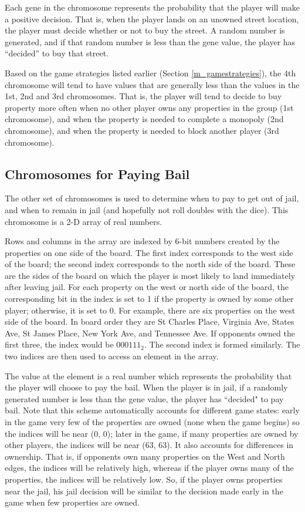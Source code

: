 Each gene in the chromosome represents the probability that the player will make
a positive decision. That is, when the player lands on an unowned street
location, the player must decide whether or not to buy the street. A random
number is generated, and if that random number is less than the gene value, the
player has ``decided'' to buy that street.

Based on the game strategies listed earlier (Section \ref{m_gamestrategies}),
the 4th chromosome will tend to have values that are generally
less than the values in the 1st, 2nd and 3rd chromosomes. That is, the player
will tend to decide to buy property more often when no other player owns any
properties in the group (1st chromosome), and when the property is needed to
complete a monopoly (2nd chromosome), and when the property is needed to block
another player (3rd chromosome).

\subsection{Chromosomes for Paying Bail}

The other set of chromosomes is used to determine when to pay to get out of
jail, and when to remain in jail (and hopefully not roll doubles with the dice).
This chromosome is a 2-D array of real numbers.

Rows and columns in the array are indexed by 6-bit numbers created by the
properties on one side of the board. The first index corresponds to the west
side of the board; the second index corresponds to the north side of the board.
These are the sides of the board on which the player is most likely to land
immediately after leaving jail. For each property on the west or north side of
the board, the corresponding bit in the index is set to 1 if the property is
owned by some other player; otherwise, it is set to 0. For example, there are
six properties on the west side of the board. In board order they are St Charles
Place, Virginia Ave, States Ave, St James Place, New York Ave, and Tennessee
Ave. If opponents owned the first three, the index would be $000111_2$. The
second index is formed similarly. The two indices are then used to access an
element in the array.

The value at the element is a real number which represents the probability that the
player will choose to pay the bail. When the player is in jail, if a randomly
generated number is less than the gene value, the player has ``decided" to pay
bail. Note that this scheme automatically accounts for different game states:
early in the game very few of the properties are owned (none when the game
begins) so the indices will be near (0, 0); later in the game, if many
properties are owned by other players, the indices will be near (63, 63). It
also accounts for differences in ownership. That is, if opponents own many
properties on the West and North edges, the indices will be relatively high,
whereas if the player owns many of the properties, the indices will be
relatively low. So, if the player owns properties near the jail, his jail
decision will be similar to the decision made early in the game when few
properties are owned.

